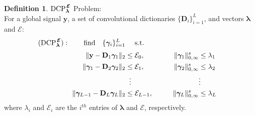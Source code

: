 \documentclass[10pt,journal]{IEEEtran}
\def\y{{\mathbf y}}
\def\D{{\mathbf D}}
\def\gama{{\boldsymbol \gamma}}
\def\lamda{{\boldsymbol \lambda}}
\def\vps{{\bm{\mathbf{\mathcal{E}}}}}
\def\DCPE{{\text{DCP}_\lamda^{\hspace{0.04cm} \vps}}}
\theoremstyle{plain}
\theoremstyle{definition}
\newtheorem{defn}[thm]{Definition} %
\begin{document}
\begin{defn}{$\DCPE$ Problem:}\\
	For a global signal $\y$, a set of convolutional dictionaries $\{ \D_i \}_{i=1}^L$, and vectors $\lamda$ and $\vps$:
	\begin{align*}
	 (\DCPE): \quad \quad \text{find} \quad \{\gama_i\}_{i=1}^{L} & \quad \text{ s.t. } & \\[.1cm]
	\| \y - \D_1 \gama_1\|_2 & \leq \mathcal{E}_0, & \qquad \| \gama_1 \|^s_{0,\infty}  & \leq \lambda_1 &\\
	\| \gama_1 - \D_2 \gama_2 \|_2 & \leq \mathcal{E}_1,& \qquad  \| \gama_2 \|^s_{0,\infty}  & \leq \lambda_2 &\\
	 &\phantom{..} \vdots & \phantom{..} &\vdots  \\
	\| \gama_{L-1} - \D_L \gama_L \|_2  &\leq \mathcal{E}_{L-1},& \qquad \| \gama_{L} \|^s_{0,\infty} &\leq \lambda_L &
	\end{align*}
	where $\lambda_i$ and $\mathcal{E}_i$ are the $i^{th}$ entries of $\lamda$ and $\vps$, respectively.
\end{defn}
\end{document}
